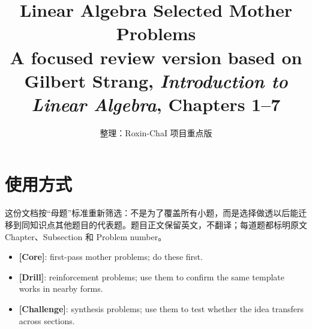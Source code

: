 ﻿\documentclass[12pt,a4paper]{ctexart}
\title{\textbf{Linear Algebra Selected Mother Problems}\\
\large A focused review version based on Gilbert Strang, \textit{Introduction to Linear Algebra}, Chapters 1--7}
\author{整理：Roxin-ChaI 项目重点版}
\date{}
\newcommand{\core}{\textbf{\textcolor{blue!70!black}{[Core]}}}
\newcommand{\drill}{\textbf{\textcolor{teal!70!black}{[Drill]}}}
\newcommand{\challenge}{\textbf{\textcolor{red!70!black}{[Challenge]}}}
\begin{document}
\maketitle

\section*{使用方式}
这份文档按“母题”标准重新筛选：不是为了覆盖所有小题，而是选择做透以后能迁移到同知识点其他题目的代表题。题目正文保留英文，不翻译；每道题都标明原文 Chapter、Subsection 和 Problem number。

\begin{itemize}
  \item \core{}: first-pass mother problems; do these first.
  \item \drill{}: reinforcement problems; use them to confirm the same template works in nearby forms.
  \item \challenge{}: synthesis problems; use them to test whether the idea transfers across sections.
\end{itemize}

\tableofcontents
\newpage
\end{document}
